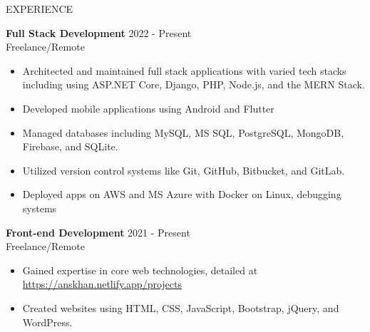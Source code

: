 \documentclass{resume} %
\begin{document}
\begin{rSection}{EXPERIENCE}

\textbf{Full Stack Development} \hfill 2022 - Present\\
Freelance/Remote %
 \begin{itemize}
    \itemsep -3pt {} 
     \item Architected and maintained full stack applications with varied tech stacks including using ASP.NET Core, Django, PHP, Node.js, and the MERN Stack.
     \item Developed mobile applications using Android and Flutter
     \item Managed databases including MySQL, MS SQL, PostgreSQL, MongoDB, Firebase, and SQLite. \item Utilized version control systems like Git, GitHub, Bitbucket, and GitLab.
     \item Deployed apps on AWS and MS Azure with Docker on Linux, debugging systems 
 \end{itemize}


\textbf{Front-end Development} \hfill 2021  - Present\\
Freelance/Remote  \hfill %
 \begin{itemize}
    \itemsep -3pt {} 
     \item Gained expertise in core web technologies, detailed at  \href{https://anskhan.netlify.app/projects}{https://anskhan.netlify.app/projects}
     \item Created websites using HTML, CSS, JavaScript, Bootstrap, jQuery, and WordPress.
   
 \end{itemize}
 

\end{rSection} 

\end{document}
